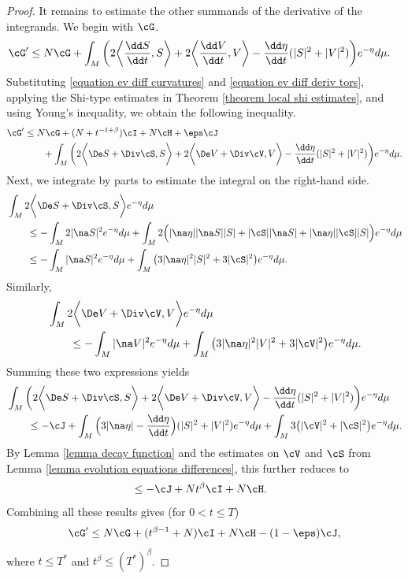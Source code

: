 \documentclass[hidelinks, 12pt, oneside, reqno]{amsart}
\begin{document}
\begin{proof}
It remains to estimate the other summands of the derivative of the integrands. We begin with $\cG$. 
\begin{align*}
    \cG' &\le N\cG + \int_M \bigg( 2  \bigg \langle \frac{\dd S}{\dd t} , S \bigg \rangle + 2  \bigg \langle \frac{\dd V}{\dd t} , V \bigg \rangle - \frac{\dd \eta}{\dd t}(|S|^2 + |V|^2) \bigg) e^{-\eta} d\mu.
\end{align*}
Substituting \eqref{equation ev diff curvatures} and \eqref{equation ev diff deriv tors}, applying the Shi-type estimates in Theorem \ref{theorem local shi estimates}, and using Young's inequality, we obtain the following inequality.
\begin{align*}
    \cG' &\le N\cG + (N + t^{-1+\beta})\cI + N\cH + \eps \cJ \\
    &\qquad + \int_M \bigg( 2  \bigg \langle \De S + \Div \cS , S \bigg \rangle + 2  \bigg \langle \De V + \Div \cV , V \bigg \rangle  - \frac{\dd \eta}{\dd t}(|S|^2 + |V|^2) \bigg) e^{-\eta} d\mu. 
\end{align*}
Next, we integrate by parts to estimate the integral on the right-hand side. 
\begin{align*}
    &\int_M  2  \bigg \langle \De S + \Div \cS , S \bigg \rangle e^{-\eta} d\mu \\
    &\qquad \le  - \int_M 2|\na S|^2 e^{-\eta} d\mu +  \int_M 2\Big( |\na \eta||\na S||S| + |\cS||\na S| + |\na \eta||\cS||S| \Big ) e^{-\eta} d\mu \\
    &\qquad \le - \int_M |\na S|^2 e^{-\eta} d\mu + \int_M \big( 3|\na \eta|^2|S|^2 + 3|\cS|^2 \big ) e^{-\eta} d\mu.
\end{align*}
Similarly,
\begin{align*}
    &\int_M  2  \bigg \langle \De V + \Div \cV , V \bigg \rangle e^{-\eta} d\mu \\
    &\qquad \le - \int_M |\na V|^2 e^{-\eta} d\mu + \int_M \big( 3|\na \eta|^2|V|^2 + 3|\cV|^2 \big ) e^{-\eta} d\mu.
\end{align*}
Summing these two expressions yields
\begin{align*}
    & \int_M \bigg( 2  \bigg \langle \De S + \Div \cS , S \bigg \rangle + 2  \bigg \langle \De V + \Div \cV , V \bigg \rangle  - \frac{\dd \eta}{\dd t}(|S|^2 + |V|^2) \bigg) e^{-\eta} d\mu \\
    & \qquad \le - \cJ  + \int_M \Big(  3|\na \eta| - \frac{\dd \eta}{\dd t}\Big) (|S|^2 + |V|^2) e^{-\eta} d\mu  + \int_M 3\big( |\cV|^2  + |\cS|^2 \big ) e^{-\eta} d\mu.
\end{align*}
By Lemma \ref{lemma decay function} and the estimates on $\cV$ and $\cS$ from Lemma \ref{lemma evolution equations differences}, this further reduces to
\begin{align*}
    &\le -\cJ + Nt^\beta \cI + N\cH.
\end{align*}
Combining all these results gives (for $0 < t \le T$)
\begin{equation}\label{equation derivative of G}
\cG' \le N\cG + (t^{\beta -1} + N) \cI + N\cH - (1-\eps) \cJ,
\end{equation}
where $t \le T^*$ and $t^\beta \le (T^*)^\beta$. 


\end{proof}
\end{document}
